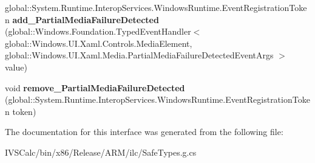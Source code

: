 \begin{DoxyCompactItemize}
\item 
\mbox{\label{interface_windows_1_1_u_i_1_1_xaml_1_1_controls_1_1_i_media_element3_a690260fef718dc5d1a0404578b728d57}} 
global\+::\+System.\+Runtime.\+Interop\+Services.\+Windows\+Runtime.\+Event\+Registration\+Token {\bfseries add\+\_\+\+Partial\+Media\+Failure\+Detected} (global\+::\+Windows.\+Foundation.\+Typed\+Event\+Handler$<$ global\+::\+Windows.\+U\+I.\+Xaml.\+Controls.\+Media\+Element, global\+::\+Windows.\+U\+I.\+Xaml.\+Media.\+Partial\+Media\+Failure\+Detected\+Event\+Args $>$ value)
\item 
\mbox{\label{interface_windows_1_1_u_i_1_1_xaml_1_1_controls_1_1_i_media_element3_a69e76e84315d2458547b9a6238fbbbf6}} 
void {\bfseries remove\+\_\+\+Partial\+Media\+Failure\+Detected} (global\+::\+System.\+Runtime.\+Interop\+Services.\+Windows\+Runtime.\+Event\+Registration\+Token token)
\end{DoxyCompactItemize}


The documentation for this interface was generated from the following file\+:\begin{DoxyCompactItemize}
\item 
I\+V\+S\+Calc/bin/x86/\+Release/\+A\+R\+M/ilc/Safe\+Types.\+g.\+cs\end{DoxyCompactItemize}
